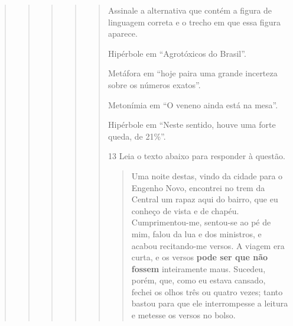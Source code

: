 \begin{quote}
\begin{quote}
\begin{quote}
\begin{quote}
\begin{quote}
\begin{quote}
\end{quote}


Assinale a alternativa que contém a figura de linguagem correta e o
trecho em que essa figura aparece.

\begin{escolha}

    \item Hipérbole em ``Agrotóxicos do Brasil''. 

    \item Metáfora em ``hoje paira uma grande incerteza sobre os números exatos''. 

    \item Metonímia em ``O veneno ainda está na mesa''. 

    \item Hipérbole em ``Neste sentido, houve uma forte queda, de 21\%''. 

\end{escolha}


\num{13} Leia o texto abaixo para responder à questão. 

\begin{quote}

Uma noite destas, vindo da cidade para o Engenho
Novo, encontrei no trem da Central um rapaz aqui do
bairro, que eu conheço de vista e de chapéu. 
Cumprimentou-me, sentou-se ao pé de mim, falou da lua
e dos ministros, e acabou recitando-me versos. A viagem 
era curta, e os versos \textbf{pode ser que não fossem} 
inteiramente maus. Sucedeu, porém, que, como eu estava 
cansado, fechei os olhos três ou quatro vezes; tanto 
bastou para que ele interrompesse a leitura e metesse 
os versos no bolso.

\end{quote}



\end{quote}
\end{quote}
\end{quote}
\end{quote}
\end{quote}
